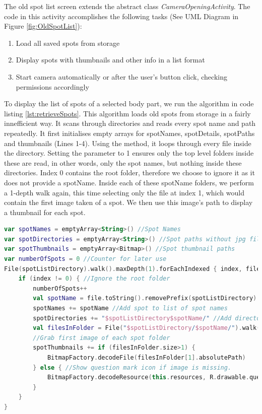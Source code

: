The old spot list screen extends the abstract class \emph{CameraOpeningActivity}. The code in this activity accomplishes the following tasks (See UML Diagram in Figure \ref{fig:OldSpotList}):
\begin{enumerate}
    \item Load all saved spots from storage
    \item Display spots with thumbnails and other info in a list format
    \item Start camera automatically or after the user's button click, checking permissions accordingly
\end{enumerate}
To display the list of spots of a selected body part, we run the algorithm in code listing \ref{lst:retrieveSpots}. This algorithm loads old spots from storage in a fairly innefficient way. It scans through directories and reads every spot name and path repeatedly. It first initialises empty arrays for spotNames, spotDetails, spotPaths and thumbnails (Lines 1-4). Using the    method, it loops through every file inside the  directory. Setting the  parameter to 1 ensures only the top level folders inside these are read, in other words, only the spot names, but nothing inside these directories. Index 0 contains the root folder, therefore we choose to ignore it as it does not provide a spotName. Inside each of these spotName folders, we perform a 1-depth walk again, this time selecting only the file at index 1, which would contain the first image taken of a spot. We then use this image's path to display a thumbnail for each spot.


\clearpage
\begin{lstlisting}[caption={Loading Old Spots}, label={lst:retrieveSpots}, language=Kotlin]
var spotNames = emptyArray<String>() //Spot Names
var spotDirectories = emptyArray<String>() //Spot paths without jpg file
var spotThumbnails = emptyArray<Bitmap>() //Spot thumbnail paths
var numberOfSpots = 0 //Counter for later use
File(spotListDirectory).walk().maxDepth(1).forEachIndexed { index, file ->
    if (index != 0) { //Ignore the root folder
        numberOfSpots++
        val spotName = file.toString().removePrefix(spotListDirectory)
        spotNames += spotName //Add spot to list of spot names
        spotDirectories += "$spotListDirectory$spotName/" //Add directory
        val filesInFolder = File("$spotListDirectory/$spotName/").walk().maxDepth(1).toList()
        //Grab first image of each spot folder
        spotThumbnails += if (filesInFolder.size>1) {
            BitmapFactory.decodeFile(filesInFolder[1].absolutePath)
        } else { //Show question mark icon if image is missing.
            BitmapFactory.decodeResource(this.resources, R.drawable.questionmark)
        }
    }
}
\end{lstlisting}


